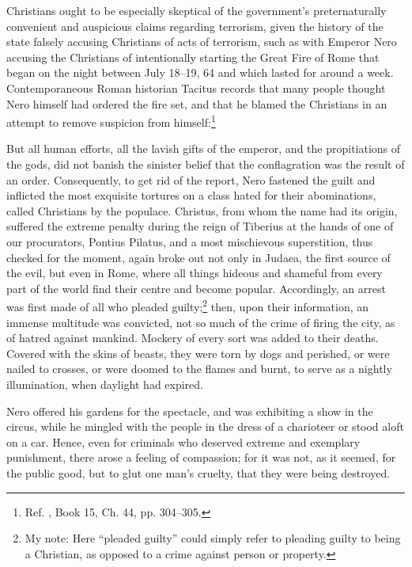 \documentclass[letterpaper,12pt]{article}
\newenvironment{squotation}
  {\small\quotation}
  {\endquotation\normalsize}
\begin{document}
Christians ought to be especially skeptical of the government's preternaturally convenient and auspicious claims regarding terrorism, given the history of the state falsely accusing Christians of acts of terrorism, such as with Emperor Nero accusing the Christians of intentionally starting the Great Fire of Rome that began on the night between July 18--19, 64 and which lasted for around a week. Contemporaneous Roman historian Tacitus records that many people thought Nero himself had ordered the fire set, and that he blamed the Christians in an attempt to remove suspicion from himself:\footnote{Ref. , Book 15, Ch. 44, pp. 304--305.}

\begin{squotation}
But all human efforts, all the lavish gifts of the emperor, and the propitiations of the gods, did not banish the sinister belief that the conflagration was the result of an order. Consequently, to get rid of the report, Nero fastened the guilt and inflicted the most exquisite tortures on a class hated for their abominations, called Christians by the populace. Christus, from whom the name had its origin, suffered the extreme penalty during the reign of Tiberius at the hands of one of our procurators, Pontius Pilatus, and a most mischievous superstition, thus checked for the moment, again broke out not only in Judaea, the first source of the evil, but even in Rome, where all things hideous and shameful from every part of the world find their centre and become popular. Accordingly, an arrest was first made of all who pleaded guilty;\footnote{My note: Here ``pleaded guilty'' could simply refer to pleading guilty to being a Christian, as opposed to a crime against person or property.} then, upon their information, an immense multitude was convicted, not so much of the crime of firing the city, as of hatred against mankind. Mockery of every sort was added to their deaths. Covered with the skins of beasts, they were torn by dogs and perished, or were nailed to crosses, or were doomed to the flames and burnt, to serve as a nightly illumination, when daylight had expired.

Nero offered his gardens for the spectacle, and was exhibiting a show in the circus, while he mingled with the people in the dress of a charioteer or stood aloft on a car. Hence, even for criminals who deserved extreme and exemplary punishment, there arose a feeling of compassion; for it was not, as it seemed, for the public good, but to glut one man's cruelty, that they were being destroyed.
\end{squotation}
\end{document}
